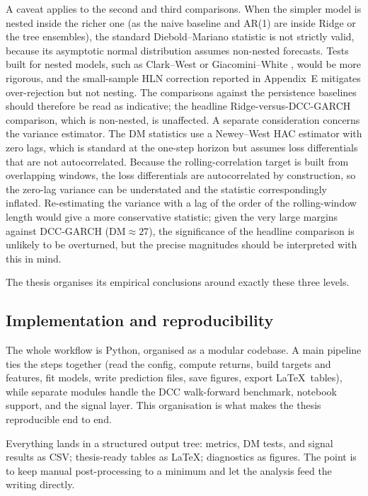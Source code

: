 A caveat applies to the second and third comparisons. When the simpler model is nested inside the richer one (as the naive baseline and AR(1) are inside Ridge or the tree ensembles), the standard Diebold--Mariano statistic is not strictly valid, because its asymptotic normal distribution assumes non-nested forecasts. Tests built for nested models, such as Clark--West or Giacomini--White \cite{clark2007nested,giacomini2006tests}, would be more rigorous, and the small-sample HLN correction reported in Appendix~E mitigates over-rejection but not nesting. The comparisons against the persistence baselines should therefore be read as indicative; the headline Ridge-versus-DCC-GARCH comparison, which is non-nested, is unaffected. A separate consideration concerns the variance estimator. The DM statistics use a Newey--West HAC estimator with zero lags, which is standard at the one-step horizon but assumes loss differentials that are not autocorrelated. Because the rolling-correlation target is built from overlapping windows, the loss differentials are autocorrelated by construction, so the zero-lag variance can be understated and the statistic correspondingly inflated. Re-estimating the variance with a lag of the order of the rolling-window length would give a more conservative statistic; given the very large margins against DCC-GARCH ($\mathrm{DM}\approx 27$), the significance of the headline comparison is unlikely to be overturned, but the precise magnitudes should be interpreted with this in mind.

The thesis organises its empirical conclusions around exactly these three levels.

\subsection{Implementation and reproducibility}

The whole workflow is Python, organised as a modular codebase. A main pipeline ties the steps together (read the config, compute returns, build targets and features, fit models, write prediction files, save figures, export \LaTeX\ tables), while separate modules handle the DCC walk-forward benchmark, notebook support, and the signal layer. This organisation is what makes the thesis reproducible end to end.

Everything lands in a structured output tree: metrics, DM tests, and signal results as CSV; thesis-ready tables as \LaTeX; diagnostics as figures. The point is to keep manual post-processing to a minimum and let the analysis feed the writing directly.

